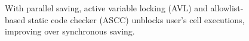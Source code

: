 \begin{figure}[t]
    \vspace{-3mm}
    \caption{With parallel saving, active variable locking (AVL) and allowlist-based static code checker (ASCC) unblocks user's cell executions, improving over synchronous saving.}
    \label{fig:exp_iv_ecdf_compare}
    \vspace{\undercaptionspace}
\end{figure}
